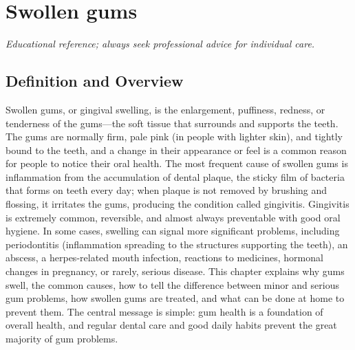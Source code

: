 \chapter{Swollen gums}

\medskip
\noindent\textit{Educational reference; always seek professional advice for individual care.}

\section*{Definition and Overview}
Swollen gums, or gingival swelling, is the enlargement, puffiness, redness, or tenderness of the gums---the soft tissue that surrounds and supports the teeth. The gums are normally firm, pale pink (in people with lighter skin), and tightly bound to the teeth, and a change in their appearance or feel is a common reason for people to notice their oral health. The most frequent cause of swollen gums is inflammation from the accumulation of dental plaque, the sticky film of bacteria that forms on teeth every day; when plaque is not removed by brushing and flossing, it irritates the gums, producing the condition called gingivitis. Gingivitis is extremely common, reversible, and almost always preventable with good oral hygiene. In some cases, swelling can signal more significant problems, including periodontitis (inflammation spreading to the structures supporting the teeth), an abscess, a herpes-related mouth infection, reactions to medicines, hormonal changes in pregnancy, or rarely, serious disease. This chapter explains why gums swell, the common causes, how to tell the difference between minor and serious gum problems, how swollen gums are treated, and what can be done at home to prevent them. The central message is simple: gum health is a foundation of overall health, and regular dental care and good daily habits prevent the great majority of gum problems.


